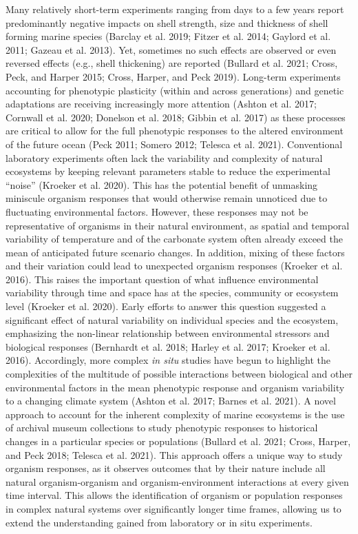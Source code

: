 \documentclass[smallextended]{svjour3}       %
\begin{document}
Many relatively short-term experiments ranging from days to a few years
report predominantly negative impacts on shell strength, size and
thickness of shell forming marine species (Barclay et al. 2019; Fitzer
et al. 2014; Gaylord et al. 2011; Gazeau et al. 2013). Yet, sometimes no
such effects are observed or even reversed effects (e.g., shell
thickening) are reported (Bullard et al. 2021; Cross, Peck, and Harper
2015; Cross, Harper, and Peck 2019). Long-term experiments accounting
for phenotypic plasticity (within and across generations) and genetic
adaptations are receiving increasingly more attention (Ashton et al.
2017; Cornwall et al. 2020; Donelson et al. 2018; Gibbin et al. 2017) as
these processes are critical to allow for the full phenotypic responses
to the altered environment of the future ocean (Peck 2011; Somero 2012;
Telesca et al. 2021). Conventional laboratory experiments often lack the
variability and complexity of natural ecosystems by keeping relevant
parameters stable to reduce the experimental ``noise'' (Kroeker et al.
2020). This has the potential benefit of unmasking miniscule organism
responses that would otherwise remain unnoticed due to fluctuating
environmental factors. However, these responses may not be
representative of organisms in their natural environment, as spatial and
temporal variability of temperature and of the carbonate system often
already exceed the mean of anticipated future scenario changes. In
addition, mixing of these factors and their variation could lead to
unexpected organism responses (Kroeker et al. 2016). This raises the
important question of what influence environmental variability through
time and space has at the species, community or ecosystem level (Kroeker
et al. 2020). Early efforts to answer this question suggested a
significant effect of natural variability on individual species and the
ecosystem, emphasizing the non-linear relationship between environmental
stressors and biological responses (Bernhardt et al. 2018; Harley et al.
2017; Kroeker et al. 2016). Accordingly, more complex \emph{in situ}
studies have begun to highlight the complexities of the multitude of
possible interactions between biological and other environmental factors
in the mean phenotypic response and organism variability to a changing
climate system (Ashton et al. 2017; Barnes et al. 2021). A novel
approach to account for the inherent complexity of marine ecosystems is
the use of archival museum collections to study phenotypic responses to
historical changes in a particular species or populations (Bullard et
al. 2021; Cross, Harper, and Peck 2018; Telesca et al. 2021). This
approach offers a unique way to study organism responses, as it observes
outcomes that by their nature include all natural organism-organism and
organism-environment interactions at every given time interval. This
allows the identification of organism or population responses in complex
natural systems over significantly longer time frames, allowing us to
extend the understanding gained from laboratory or in situ experiments.
\end{document}
